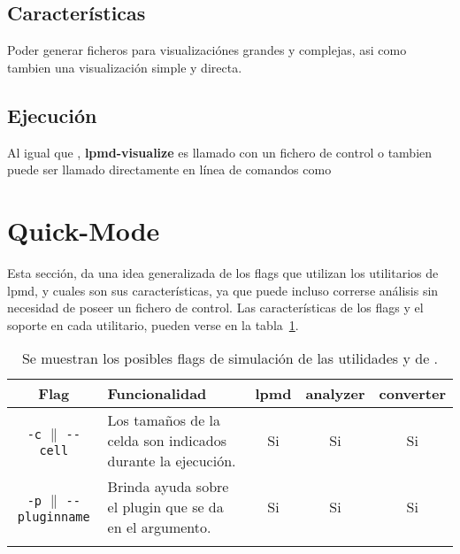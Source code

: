 \subsection{Caracter\'isticas}
Poder generar ficheros para visualizaci\'ones grandes y complejas, asi como tambien una visualizaci\'on simple y directa.

\subsection{Ejecuci\'on}

Al igual que {\lpmd}, \textbf{lpmd-visualize} es llamado con un fichero de control o tambien puede ser llamado directamente en l\'inea de comandos como

%

\section{Quick-Mode}
\label{chap:util-quickmode}

Esta secci\'on, da una idea generalizada de los flags que utilizan los utilitarios de lpmd, y cuales son sus caracter\'isticas, ya que puede incluso correrse an\'alisis sin necesidad de poseer un fichero de control. Las caracter\'isticas de los flags y el soporte en cada utilitario, pueden verse en la tabla~\ref{tab:quickmode}.

\begin{table}[h!]
 \centering
 \begin{tabular}{cp{5cm}ccc}\\
 \hline\hline
  Flag & Funcionalidad & lpmd & analyzer & converter \\
 \hline\hline
\verb|-c| $\parallel$ \verb|--cell|&Los tama\~nos de la celda son indicados durante la ejecuci\'on.&Si&Si&Si\\\hline
\verb|-p| $\parallel$ \verb|--pluginname|&Brinda ayuda sobre el plugin que se da en el argumento.&Si&Si&Si\\\hline
 &&&&\\\hline
 \end{tabular}
 \label{tab:quickmode}
 \caption{Se muestran los posibles flags de simulaci\'on de las utilidades y de {\lpmd}.}
\end{table}
